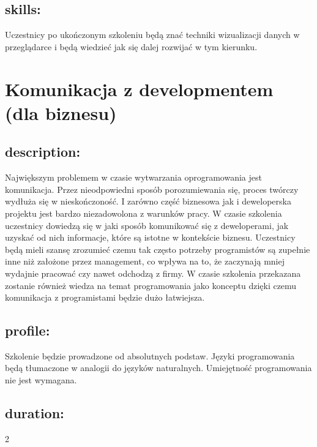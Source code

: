 \documentclass{article}[10pt]
\begin{document}
	\subsection*{skills:}
\begin{adjustwidth}{2cm}{}
	
Uczestnicy po ukończonym szkoleniu będą znać techniki wizualizacji danych w przeglądarce i będą wiedzieć jak się dalej rozwijać w tym kierunku.


\end{adjustwidth}

\newpage


    
	\section{Komunikacja z developmentem (dla biznesu)}

	\subsection*{description:}
	\begin{adjustwidth}{2cm}{}
		
Największym problemem w czasie wytwarzania oprogramowania jest komunikacja. Przez nieodpowiedni sposób porozumiewania się, proces twórczy wydłuża się w nieskończoność. I zarówno część biznesowa jak i deweloperska projektu jest bardzo niezadowolona z warunków pracy.
W czasie szkolenia uczestnicy dowiedzą się w jaki sposób komunikować się z deweloperami, jak uzyskać od nich informacje, które są istotne w kontekście biznesu. 
Uczestnicy będą mieli szansę zrozumieć czemu tak często potrzeby programistów są zupełnie inne niż założone przez management, co wpływa na to, że zaczynają mniej wydajnie pracować czy nawet odchodzą z firmy. W czasie szkolenia przekazana zostanie również wiedza na temat programowania jako konceptu dzięki czemu komunikacja z programistami będzie dużo łatwiejsza.
	\end{adjustwidth}
	\subsection*{profile:}
\begin{adjustwidth}{2cm}{}
	Szkolenie będzie prowadzone od absolutnych podstaw. Języki programowania będą tłumaczone w analogii do języków naturalnych. Umiejętność programowania nie jest wymagana.
\end{adjustwidth}
	\subsection*{duration:}
\begin{adjustwidth}{2cm}{}
	2
\end{adjustwidth}
\end{document}
